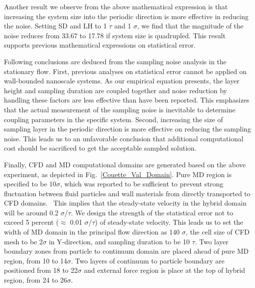 \documentclass[preprint,12pt]{elsarticle}
\begin{document}
Another result we observe from the above mathematical expression is that increasing the system size into the periodic direction is more effective in reducing the noise. Setting SD and LH to 1 $\tau$ and 1 $\sigma$, we find that the magnitude of the noise reduces from 33.67 to 17.78 if system size is quadrupled. This result supports previous mathematical expressions on statistical error.




Following conclusions are deduced from the sampling noise analysis in the stationary flow. First, previous analyses on statistical error cannot be applied on wall-bounded nanoscale systems. As our empirical equation presents, the layer height and sampling duration are coupled together and noise reduction by handling these factors are less effective than have been reported. This emphasizes that the actual measurement of the sampling noise is inevitable to determine coupling parameters in the specific system.
Second, increasing the size of sampling layer in the periodic direction is more effective on reducing the sampling noise. This leads us to an unfavorable conclusion that additional computational cost should be sacrificed to get the acceptable sampled solution.


Finally, CFD and MD computational domains are generated based on the above experiment, as depicted in Fig.~\ref{Couette_Val_Domain}. Pure MD region is specified to be 10$\sigma$, which was reported to be sufficient to prevent strong fluctuation between fluid particles and wall materials from directly transported to CFD domains.~\cite{Yen} This implies that the steady-state velocity in the hybrid domain will be around 0.2 $\sigma$/$\tau$. We design the strength of the statistical error not to exceed 5 percent ($\approx$ 0.01 $\sigma$/$\tau$) of steady-state velocity. This leads us to set the width of MD domain in the principal flow direction as 140 $\sigma$, the cell size of CFD mesh to be 2$\sigma$ in Y-direction, and sampling duration to be 10 $\tau$. Two layer boundary zones from particle to continuum domain are placed ahead of pure MD region, from 10 to 14$\sigma$. Two layers of continuum to particle boundary are positioned from 18 to 22$\sigma$ and external force region is place at the top of hybrid region, from 24 to 26$\sigma$.
\end{document}
